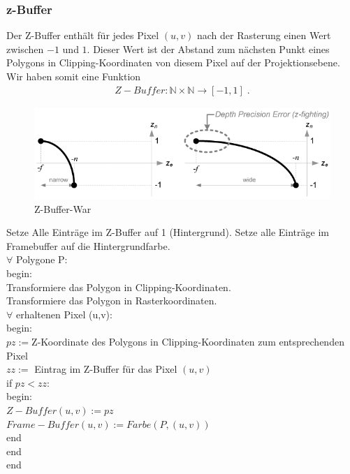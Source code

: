 \subsubsection* {z-Buffer}
Der Z-Buffer enthält für jedes Pixel $(u,v)$ nach der Rasterung  einen Wert zwischen $-1$ und $1$. Dieser Wert  ist der Abstand zum nächsten Punkt eines Polygons  in Clipping-Koordinaten von diesem Pixel auf der Projektionsebene.  Wir haben somit eine Funktion
\begin{align*}
Z-Buffer : \mathbb{N} \times \mathbb{N} \to [-1,1]  \; .
\end{align*}

\begin{figure}[H]
    \centering
    \includegraphics[width=1.0\textwidth]{images/gl_projectionmatrix_zbuffer_1.png}
    \caption{Z-Buffer-War}
\end{figure}



\begin{Algorithmus}
Setze Alle Einträge im Z-Buffer auf 1 (Hintergrund).
Setze alle Einträge im Framebuffer auf die Hintergrundfarbe. \\
$\forall$ Polygone P: \\
begin: \\
Transformiere das Polygon in Clipping-Koordinaten. \\
Transformiere das Polygon in Rasterkoordinaten. \\
$\forall$ erhaltenen Pixel (u,v): \\
begin: \\
$pz := $Z-Koordinate des Polygons in Clipping-Koordinaten zum entsprechenden Pixel \\
$zz:=$ Eintrag im Z-Buffer für das Pixel $(u,v)$ \\
if $pz < zz$: \\
begin: \\
$Z-Buffer(u,v) := pz$ \\
$Frame-Buffer(u,v) := Farbe(P,(u,v))$ \\
end \\
end \\
end
\end{Algorithmus}



